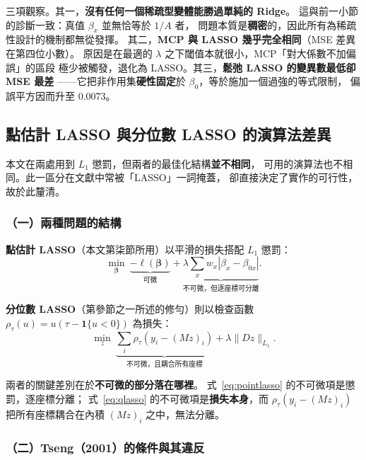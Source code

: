 \documentclass[UTF8, fontset=macnew, a4paper, 12pt]{ctexart}
\begin{document}
三項觀察。其一，\textbf{沒有任何一個稀疏型變體能勝過單純的 Ridge}。
這與前一小節的診斷一致：真值 $\beta_x$ 並無恰等於 $1/A$ 者，
問題本質是\textbf{稠密}的，因此所有為稀疏性設計的機制都無從發揮。
其二，\textbf{MCP 與 LASSO 幾乎完全相同}（MSE 差異在第四位小數）。
原因是在最適的 $\lambda$ 之下閾值本就很小，MCP「對大係數不加偏誤」的區段
極少被觸發，退化為 LASSO。其三，\textbf{鬆弛 LASSO 的變異數最低卻 MSE 最差}
——它把非作用集\textbf{硬性固定}於 $\beta_0$，等於施加一個過強的等式限制，
偏誤平方因而升至 0.0073。

\subsection{點估計 LASSO 與分位數 LASSO 的演算法差異}\label{sec:algodiff}

本文在兩處用到 $L_1$ 懲罰，但兩者的最佳化結構\textbf{並不相同}，
可用的演算法也不相同。此一區分在文獻中常被「LASSO」一詞掩蓋，
卻直接決定了實作的可行性，故於此釐清。

\subsubsection{（一）兩種問題的結構}

\textbf{點估計 LASSO}（本文第柒節所用）以平滑的損失搭配 $L_1$ 懲罰：
\begin{equation}\label{eq:pointlasso}
\min_{\boldsymbol{\beta}}\ \underbrace{-\ell(\boldsymbol{\beta})}_{\text{可微}}
+\underbrace{\lambda\textstyle\sum_x w_x|\beta_x-\beta_{0x}|}_{\text{不可微，但逐座標可分離}} .
\end{equation}

\textbf{分位數 LASSO}（第參節之一所述的修勻）則以檢查函數
$\rho_\tau(u)=u(\tau-\mathbf{1}\{u<0\})$ 為損失：
\begin{equation}\label{eq:qlasso}
\min_{z}\ \underbrace{\textstyle\sum_i\rho_\tau(y_i-(Mz)_i)}_{\text{不可微，且耦合所有座標}}
+\lambda\|Dz\|_{L_1}.
\end{equation}

兩者的關鍵差別在於\textbf{不可微的部分落在哪裡}。
式~\eqref{eq:pointlasso} 的不可微項是懲罰，逐座標分離；
式~\eqref{eq:qlasso} 的不可微項是\textbf{損失本身}，而
$\rho_\tau(y_i-(Mz)_i)$ 把所有座標耦合在內積 $(Mz)_i$ 之中，無法分離。

\subsubsection{（二）Tseng（2001）的條件與其違反}
\end{document}
